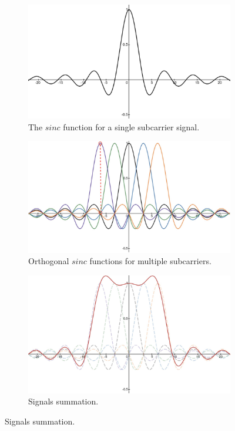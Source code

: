 \documentclass[binding=0.7cm, oneside]{sapthesis}
\begin{document}
\begin{figure}[h!]
    \centering
    \begin{subfigure}{0.45\textwidth}
        \includegraphics[width=\textwidth]{images/sinc_func_alone.jpg}
        \caption{The $sinc$ function for a single subcarrier signal.}
        \label{fig:sinc_func}
    \end{subfigure}
    \quad
    \begin{subfigure}{0.45\textwidth}
        \includegraphics[width=\textwidth]{images/multiple_sinc.jpg}
        \caption{Orthogonal $sinc$ functions for multiple subcarriers.}
        \label{fig:multiple_sinc}
    \end{subfigure}
    \begin{subfigure}{0.45\textwidth}
        \centering
        \includegraphics[width=\textwidth]{images/summationSinc.jpg}
        \caption{Signals summation.}
        \label{fig:summation}
    \end{subfigure}
\end{figure}
\end{document}
